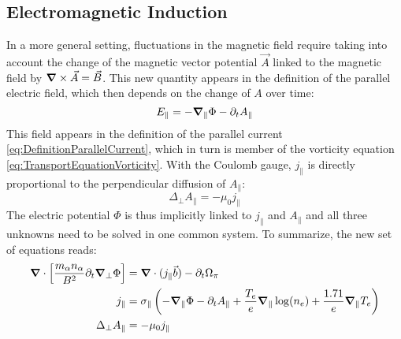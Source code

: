 \subsection{Electromagnetic Induction}
In a more general setting, fluctuations in the magnetic field require taking into account the change of the magnetic vector potential $\vec{A}$ linked to the magnetic field by $\grad\times\vec{A} = \vec{B}$. This new quantity appears in the definition of the parallel electric field, which then depends on the change of $A$ over time:
\begin{equation}
	\label{eq:electricField_eq_gradPhi_p_dtA}
	E_\parallel = -\grad_\parallel\Phi - \partial_t A_\parallel 
\end{equation}
This field appears in the definition of the parallel current \ref{eq:DefinitionParallelCurrent}, which in turn is member of the vorticity equation \ref{eq:TransportEquationVorticity}. With the Coulomb gauge, $j_\parallel$ is directly proportional to the perpendicular diffusion of $A_\parallel$: 
\begin{equation}
	\label{eq:DiffA_eq_mu0jPara}
	\Delta_\perp A_\parallel = -\mu_0j_\parallel
\end{equation}
The electric potential $\Phi$ is thus implicitly linked to $j_\parallel$ and $A_\parallel$ and all three unknowns need to be solved in one common system. To summarize, the new set of equations reads:
\begin{align}
	\grad\cdot\left[\frac{m_\alpha n_\alpha}{ B^2}\partial_t\grad_\perp\Phi\right] &= \grad\cdot(j_\parallel\vec{b}) - \partial_t \Omega_\pi \label{eq:NewExtendedSystem_VorticityEquation} \\
	j_\parallel &= \sigma_\parallel\left(-\grad_\parallel\Phi - \partial_tA_\parallel + \frac{ T_e}{e}\grad_\parallel\log(n_e) + \frac{1.71}{e}\grad_\parallel T_e\right) \label{eq:NewExtendedSystem_ParallelCurrent} \\
	\Delta_\perp A_\parallel &= -\mu_0j_\parallel \label{eq:NewExtendedSystem_MagneticPotential}
\end{align}

